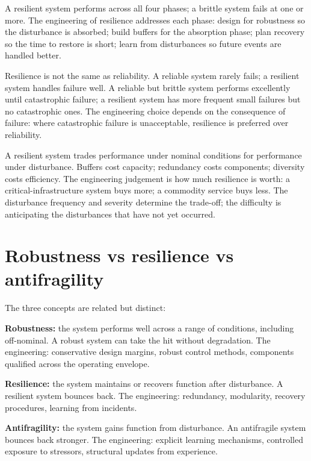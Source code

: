 A resilient system performs across all four phases; a brittle system fails at one or more. The engineering of resilience addresses each phase: design for robustness so the disturbance is absorbed; build buffers for the absorption phase; plan recovery so the time to restore is short; learn from disturbances so future events are handled better.

Resilience is not the same as reliability. A reliable system rarely fails; a resilient system handles failure well. A reliable but brittle system performs excellently until catastrophic failure; a resilient system has more frequent small failures but no catastrophic ones. The engineering choice depends on the consequence of failure: where catastrophic failure is unacceptable, resilience is preferred over reliability.

\begin{archetype}
A resilient system trades performance under nominal conditions for performance under disturbance. Buffers cost capacity; redundancy costs components; diversity costs efficiency. The engineering judgement is how much resilience is worth: a critical-infrastructure system buys more; a commodity service buys less. The disturbance frequency and severity determine the trade-off; the difficulty is anticipating the disturbances that have not yet occurred.
\end{archetype}

\section{Robustness vs resilience vs antifragility}

The three concepts are related but distinct:

\textbf{Robustness:} the system performs well across a range of conditions, including off-nominal. A robust system can take the hit without degradation. The engineering: conservative design margins, robust control methods, components qualified across the operating envelope.

\textbf{Resilience:} the system maintains or recovers function after disturbance. A resilient system bounces back. The engineering: redundancy, modularity, recovery procedures, learning from incidents.

\textbf{Antifragility:} the system gains function from disturbance. An antifragile system bounces back stronger. The engineering: explicit learning mechanisms, controlled exposure to stressors, structural updates from experience.

